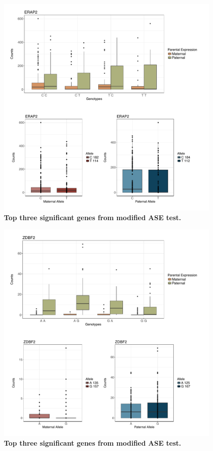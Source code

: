 \begin{figure}[!htb]
\centering \includegraphics[width=5in]{img/ch04/fig-09-ERAP2.pdf}
\caption[Top three significant genes from modified ASE test.]{\textbf{Top three significant genes from modified ASE test.} }
\label{fig:ERAP2}
\end{figure}


\begin{figure}[!htb]
\centering \includegraphics[width=5in]{img/ch04/fig-10-ZDBF2.pdf}
\caption[Top three significant genes from modified ASE test.]{\textbf{Top three significant genes from modified ASE test.} }
\label{fig:ZDBF2}
\end{figure}



